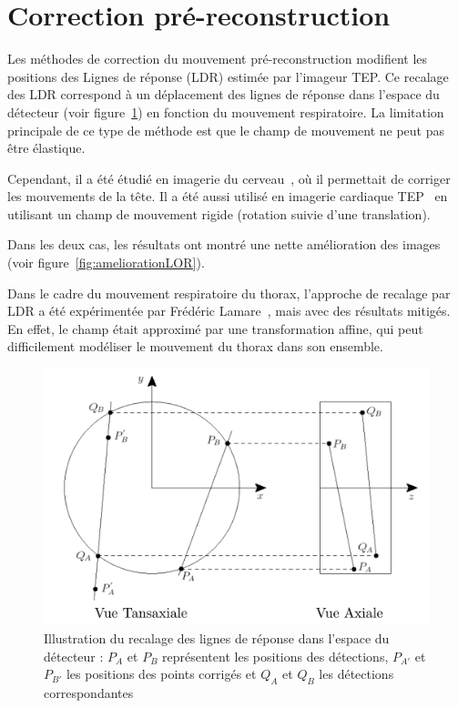 \section{Correction pré-reconstruction}

Les méthodes de correction du mouvement pré-reconstruction modifient les positions des Lignes de réponse (LDR) estimée par l'imageur TEP.
Ce recalage des LDR correspond à un déplacement des lignes de réponse dans l'espace du détecteur (voir figure~\ref{fig:recalageLOR}) en fonction du mouvement respiratoire. La limitation principale de ce type de méthode est que le champ de mouvement ne peut pas être élastique.

Cependant, il a été étudié en imagerie du cerveau~\cite{bloomfield2003design}, où il permettait de corriger les mouvements de la tête. Il a été aussi utilisé en imagerie cardiaque TEP~\cite{livieratos2005rigid} en utilisant un champ de mouvement rigide (rotation suivie d'une translation).

Dans les deux cas, les résultats ont montré une nette amélioration des images (voir figure~\ref{fig:ameliorationLOR}).

Dans le cadre du mouvement respiratoire du thorax, l'approche de recalage par LDR a été expérimentée par Frédéric Lamare~\cite{lamare2007respiratory}, mais avec des résultats mitigés. En effet, le champ était approximé par une transformation affine, qui peut difficilement modéliser le mouvement du thorax dans son ensemble.

\begin{figure}[h!]
	\begin{center}
		\includegraphics[width=12cm]{images/recalageLOR}
	\end{center}
	\caption[Illustration du recalage des lignes de réponse dans l'espace du détecteur]{Illustration du recalage des lignes de réponse dans l'espace du détecteur : $P_A$ et $P_B$ représentent les positions des détections, $P_{A'}$ et $P_{B'}$ les positions des points corrigés et $Q_A$ et $Q_B$ les détections correspondantes } 
	\label{fig:recalageLOR}
\end{figure}

